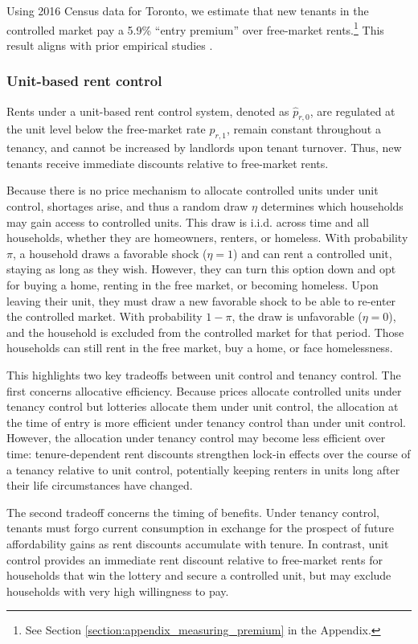 \documentclass[parskip=full]{article}
\begin{document}
Using 2016 Census data for Toronto, we estimate that new tenants in the controlled market pay a 5.9\% ``entry premium'' over free-market rents.\footnote{See Section \ref{section:appendix_measuring_premium} in the Appendix.} This result aligns with prior empirical studies \citep{nagy-1997,early-2000,cjq-2023}. 

\subsubsection{Unit-based rent control}

Rents under a unit-based rent control system, denoted as $\hat{p}_{r,0}$, are regulated at the unit level below the free-market rate $p_{r,1}$, remain constant throughout a tenancy, and cannot be increased by landlords upon tenant turnover. Thus, new tenants receive immediate discounts relative to free-market rents. 

Because there is no price mechanism to allocate controlled units under unit control, shortages arise, and thus a random draw $\eta$ determines which households may gain access to controlled units. This draw is i.i.d. across time and all households, whether they are homeowners, renters, or homeless. With probability $\pi$, a household draws a favorable shock ($\eta=1$) and can rent a controlled unit, staying as long as they wish. However, they can turn this option down and opt for buying a home, renting in the free market, or becoming homeless. Upon leaving their unit, they must draw a new favorable shock to be able to re-enter the controlled market. With probability $1-\pi$, the draw is unfavorable ($\eta=0$), and the household is excluded from the controlled market for that period. Those households can still rent in the free market, buy a home, or face homelessness. 

This highlights two key tradeoffs between unit control and tenancy control. The first concerns allocative efficiency. Because prices allocate controlled units under tenancy control but lotteries allocate them under unit control, the allocation at the time of entry is more efficient under tenancy control than under unit control. However, the allocation under tenancy control may become less efficient over time: tenure-dependent rent discounts strengthen lock-in effects over the course of a tenancy relative to unit control, potentially keeping renters in units long after their life circumstances have changed.

The second tradeoff concerns the timing of benefits. Under tenancy control, tenants must forgo current consumption in exchange for the prospect of future affordability gains as rent discounts accumulate with tenure. In contrast, unit control provides an immediate rent discount relative to free-market rents for households that win the lottery and secure a controlled unit, but may exclude households with very high willingness to pay.
\end{document}
